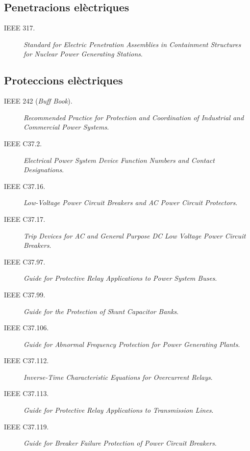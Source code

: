 \subsection*{Penetracions elèctriques}
\begin{description}
    \item [\hspace{5mm}IEEE 317.] \textit{Standard for Electric Penetration Assemblies in Containment Structures for Nuclear Power Generating Stations}.
\end{description}


\subsection*{Proteccions elèctriques}
\begin{description}
    \item [\hspace{5mm}IEEE 242 (\textit{Buff Book}).] \textit{Recommended Practice for Protection and Coordination of Industrial and Commercial Power Systems}.
    \item [\hspace{5mm}IEEE C37.2.] \textit{Electrical Power System Device Function Numbers and Contact Designations}.
    \item [\hspace{5mm}IEEE C37.16.] \textit{Low-Voltage Power Circuit Breakers and AC Power Circuit Protectors}.
    \item [\hspace{5mm}IEEE C37.17.] \textit{Trip Devices for AC and General Purpose DC Low Voltage Power Circuit Breakers}.
    \item [\hspace{5mm}IEEE C37.97.] \textit{Guide for Protective Relay Applications to Power System Buses}.
    \item [\hspace{5mm}IEEE C37.99.] \textit{Guide for the Protection of Shunt Capacitor Banks}.
    \item [\hspace{5mm}IEEE C37.106.] \textit{Guide for Abnormal Frequency Protection for Power Generating Plants}.
    \item [\hspace{5mm}IEEE C37.112.] \textit{Inverse-Time Characteristic Equations for Overcurrent Relays}.
    \item [\hspace{5mm}IEEE C37.113.] \textit{Guide for Protective Relay Applications to Transmission Lines}.
    \item [\hspace{5mm}IEEE C37.119.] \textit{Guide for Breaker Failure Protection of Power Circuit Breakers}.
\end{description}

